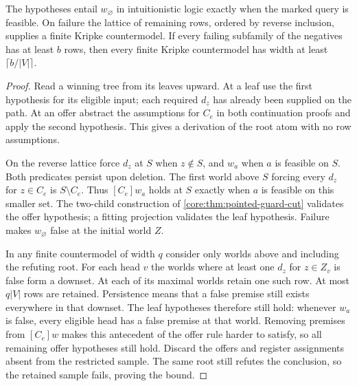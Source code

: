 \begin{proposition}
\label{core:prop:guard-sequent}
The hypotheses entail $w_\varnothing$ in intuitionistic logic exactly
when the marked query is feasible. On failure the lattice of remaining
rows, ordered by reverse inclusion, supplies a finite Kripke
countermodel. If every failing subfamily of the negatives has at
least $b$ rows, then every finite Kripke countermodel has width at
least $\lceil b/|V|\rceil$.
\end{proposition}
\begin{proof}
Read a winning tree from its leaves upward. At a leaf use the first
hypothesis for its eligible input; each required $d_z$ has already
been supplied on the path. At an offer abstract the assumptions for
$C_e$ in both continuation proofs and apply the second hypothesis.
This gives a derivation of the root atom with no row assumptions.

On the reverse lattice force $d_z$ at $S$ when $z\notin S$, and
$w_a$ when $a$ is feasible on $S$. Both predicates persist upon
deletion. The first world above $S$ forcing every $d_z$ for $z\in C_e$
is $S\setminus C_e$. Thus $[C_e]w_a$ holds at $S$ exactly when
$a$ is feasible on this smaller set. The two-child construction of
\cref{core:thm:pointed-guard-cut} validates the offer hypothesis;
a fitting projection validates the leaf hypothesis. Failure makes
$w_\varnothing$ false at the initial world $Z$.

In any finite countermodel of width $q$ consider only worlds above
and including the refuting root. For each head $v$ the worlds where
at least one $d_z$ for $z\in Z_v$ is false form a downset.
At each of its maximal worlds retain one such row. At most $q|V|$
rows are retained. Persistence means that a false premise still
exists everywhere in that downset. The leaf hypotheses therefore
still hold: whenever $w_a$ is false, every eligible head has a false
premise at that world. Removing premises from $[C_e]w$ makes this
antecedent of the offer rule harder to satisfy, so all remaining offer
hypotheses still hold. Discard the offers and register assignments
absent from the restricted sample. The same root still refutes the
conclusion, so the retained sample fails, proving the bound.
\end{proof}

